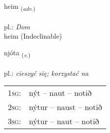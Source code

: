 \documentclass[frontgrid, backgrid]{flacards}\usepackage[]{graphicx}\usepackage[]{xcolor}
\begin{document}
{heim \small{\textsubscript{(\textit{adv.})}} \\[1ex]
\textphonetic{[heiːm]} \\
pl.: \emph{Dom} \\  [2ex]
heim (Indeclinable)}

\renewcommand{\flhead}{\vskip5pt \fboxsep=0pt {\small\bfseries\footnotesize Sagnorð | Verb}}
\renewcommand{\fcfoot}{\vskip5pt \fboxsep=0pt \hspace{2pt}{\small\bfseries\footnotesize 1K}}

\renewcommand{\blhead}{\vskip5pt {\small\bfseries\footnotesize Sagnorð | Verb }}
\renewcommand{\bcfoot}{\vskip5pt \hspace{2pt}{\small\bfseries\footnotesize 1K}}


{njóta \small{\textsubscript{(\textit{v.})}} \\[1ex] %
\textphonetic{[njouːta]} \\
pl.: \emph{cieszyć się; korzystać na} \\  [2ex]
\renewcommand*{\arraystretch}{0.8}
\begin{tabular}{p{1cm}l}
\textsc{1sg}: & nýt -- naut -- notið \\ 
\textsc{2sg}: & nýtur -- naust -- notið \\ 
\textsc{3sg}: & nýtur -- naut -- notið \\ 
\end{tabular}
}

\renewcommand{\flhead}{\vskip5pt \fboxsep=0pt {\small\bfseries\footnotesize Nafnorð | Noun}}
\renewcommand{\fcfoot}{\vskip5pt \fboxsep=0pt \hspace{2pt}{\small\bfseries\footnotesize 1K}}

\renewcommand{\blhead}{\vskip5pt {\small\bfseries\footnotesize Nafnorð | Noun }}
\renewcommand{\bcfoot}{\vskip5pt \hspace{2pt}{\small\bfseries\footnotesize 1K}}
\end{document}
